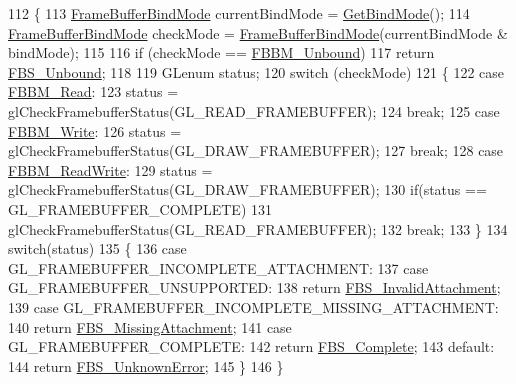 \begin{DoxyCode}
112 \{
113   \hyperlink{_frame_buffer_8h_a3318e72469ce5bc8393bd02d39bc3742}{FrameBufferBindMode} currentBindMode = \hyperlink{class_frame_buffer_a850ac6fb641f1c7a2b4e15b70f5a2286}{GetBindMode}();
114   \hyperlink{_frame_buffer_8h_a3318e72469ce5bc8393bd02d39bc3742}{FrameBufferBindMode} checkMode = \hyperlink{_frame_buffer_8h_a3318e72469ce5bc8393bd02d39bc3742}{FrameBufferBindMode}(currentBindMode
       & bindMode);
115 
116   \textcolor{keywordflow}{if} (checkMode == \hyperlink{_frame_buffer_8h_a3318e72469ce5bc8393bd02d39bc3742ae31c8735e79d8dbbb9fab918f4de1089}{FBBM\_Unbound})
117     \textcolor{keywordflow}{return} \hyperlink{_frame_buffer_8h_aad031fc418d1287580825400860cd472a50790bb3c44d0d653462bcae9b31ffe4}{FBS\_Unbound};
118 
119   GLenum status;
120   \textcolor{keywordflow}{switch} (checkMode)
121   \{
122     \textcolor{keywordflow}{case} \hyperlink{_frame_buffer_8h_a3318e72469ce5bc8393bd02d39bc3742a4ef9947282b3e4054af7d0719aa119b5}{FBBM\_Read}:
123       status = glCheckFramebufferStatus(GL\_READ\_FRAMEBUFFER);
124       \textcolor{keywordflow}{break};
125     \textcolor{keywordflow}{case} \hyperlink{_frame_buffer_8h_a3318e72469ce5bc8393bd02d39bc3742ae25ce268dda344d3d5a1cf4b3b061723}{FBBM\_Write}:
126       status = glCheckFramebufferStatus(GL\_DRAW\_FRAMEBUFFER);
127       \textcolor{keywordflow}{break};
128     \textcolor{keywordflow}{case} \hyperlink{_frame_buffer_8h_a3318e72469ce5bc8393bd02d39bc3742ae77f3997d632fbdbe50556a908b53be1}{FBBM\_ReadWrite}:
129       status = glCheckFramebufferStatus(GL\_DRAW\_FRAMEBUFFER);
130       \textcolor{keywordflow}{if}(status == GL\_FRAMEBUFFER\_COMPLETE)
131         glCheckFramebufferStatus(GL\_READ\_FRAMEBUFFER);
132       \textcolor{keywordflow}{break};
133   \} 
134   \textcolor{keywordflow}{switch}(status)
135   \{
136     \textcolor{keywordflow}{case} GL\_FRAMEBUFFER\_INCOMPLETE\_ATTACHMENT:
137     \textcolor{keywordflow}{case} GL\_FRAMEBUFFER\_UNSUPPORTED:
138       \textcolor{keywordflow}{return} \hyperlink{_frame_buffer_8h_aad031fc418d1287580825400860cd472a9cd57978f6e4baff8b5e986dd3f33cb9}{FBS\_InvalidAttachment};
139     \textcolor{keywordflow}{case} GL\_FRAMEBUFFER\_INCOMPLETE\_MISSING\_ATTACHMENT:
140       \textcolor{keywordflow}{return} \hyperlink{_frame_buffer_8h_aad031fc418d1287580825400860cd472a3843028129435d0b91325bf84f6e7e23}{FBS\_MissingAttachment};
141     \textcolor{keywordflow}{case} GL\_FRAMEBUFFER\_COMPLETE:
142       \textcolor{keywordflow}{return} \hyperlink{_frame_buffer_8h_aad031fc418d1287580825400860cd472a2a8a93779575ad00f07f4689356781ca}{FBS\_Complete};
143     \textcolor{keywordflow}{default}:
144       \textcolor{keywordflow}{return} \hyperlink{_frame_buffer_8h_aad031fc418d1287580825400860cd472af771e357b2f91d45a7d60f090a1d124a}{FBS\_UnknownError};
145   \}
146 \}
\end{DoxyCode}


